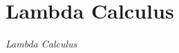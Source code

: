 \section{Lambda Calculus}\label{sec:Lambda_Calculus}
\begin{definition}\label{def:Lambda_Calculus}
  \emph{Lambda Calculus}
\end{definition}

